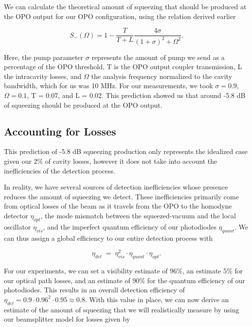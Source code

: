 We can calculate the theoretical amount of squeezing that should be produced at the OPO output for our OPO configuration, using the relation derived earlier 

\begin{equation}
  \label{eq:opo_variance}
  S_-(\Omega ) = 1 - \frac{T}{T+L}\frac{4 \sigma}{(1+\sigma)^2 + \Omega^2} .
\end{equation}

\noindent
Here, the pump parameter $\sigma$ represents the amount of pump we send as a percentage of the OPO threshold, T is the OPO output coupler transmission, L the intracavity losses, and $\Omega $ the analysis frequency normalized to the cavity bandwidth, which for us was 10 MHz.  For our measurements, we took $\sigma = 0.9$, $\Omega = 0.1$, T = 0.07, and L = 0.02.  This prediction showed us that around -5.8 dB of squeezing should be produced at the OPO output.
 
\subsection{Accounting for Losses} 
\label{accounting_for_losses} 

This prediction of -5.8 dB squeezing production only represents the idealized case given our 2\% of cavity losses, however it does not take into account the inefficiencies of the detection process.

In reality, we have several sources of detection inefficiencies whose presence reduces the amount of squeezing we detect.  These inefficiencies primarily come from optical losses of the beam as it travels from the OPO to the homodyne detector $\eta_{opt}$, the mode mismatch between the squeezed-vacuum and the local oscillator $\eta_{vis}$, and the imperfect quantum efficiency of our photodiodes $ \eta_{quant}$.  We can thus assign a global efficiency to our entire detection process with 

\begin{equation}
  \label{eq:overall_efficiency}
  \eta_{det} \; = \; \eta^2_{vis} \cdot \eta_{quant} \cdot \eta_{opt}.
\end{equation}                   

\noindent
For our experiments, we can set a visibility estimate of 96\%, an estimate 5\% for our optical path losses, and an estimate of 90\% for the quantum efficiency of our photodiodes.  This results in an overall detection efficiency of $\eta_{det} = 0.9\cdot 0.96^2 \cdot 0.95 \approx 0.8$.  With this value in place, we can now derive an estimate of the amount of squeezing that we will realistically measure by using our beamsplitter model for losses given by 

